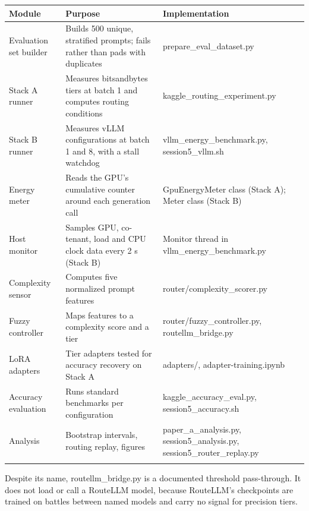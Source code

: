 \begingroup\footnotesize\setlength{\tabcolsep}{4pt}
\begin{longtable}{>{\raggedright\arraybackslash}p{32.6mm}>{\raggedright\arraybackslash}p{53.7mm}>{\raggedright\arraybackslash}p{55.3mm}}
\toprule
\textbf{Module} & \textbf{Purpose} & \textbf{Implementation} \\
\midrule
\endhead
Evaluation set builder & Builds 500 unique, stratified prompts; fails rather than pads with duplicates & prepare\_\allowbreak{}eval\_\allowbreak{}dataset.py \\*
Stack A runner & Measures bitsandbytes tiers at batch 1 and computes routing conditions & kaggle\_\allowbreak{}routing\_\allowbreak{}experiment.py \\
Stack B runner & Measures vLLM configurations at batch 1 and 8, with a stall watchdog & vllm\_\allowbreak{}energy\_\allowbreak{}benchmark.py, session5\_\allowbreak{}vllm.sh \\
Energy meter & Reads the GPU's cumulative counter around each generation call & GpuEnergyMeter class (Stack A); Meter class (Stack B) \\
Host monitor & Samples GPU, co-tenant, load and CPU clock data every 2 s (Stack B) & Monitor thread in vllm\_\allowbreak{}energy\_\allowbreak{}benchmark.py \\
Complexity sensor & Computes five normalized prompt features & router/complexity\_\allowbreak{}scorer.py \\
Fuzzy controller & Maps features to a complexity score and a tier & router/fuzzy\_\allowbreak{}controller.py, routellm\_\allowbreak{}bridge.py \\
LoRA adapters & Tier adapters tested for accuracy recovery on Stack A & adapters/, adapter-training.ipynb \\*
Accuracy evaluation & Runs standard benchmarks per configuration & kaggle\_\allowbreak{}accuracy\_\allowbreak{}eval.py, session5\_\allowbreak{}accuracy.sh \\*
Analysis & Bootstrap intervals, routing replay, figures & paper\_\allowbreak{}a\_\allowbreak{}analysis.py, session5\_\allowbreak{}analysis.py, session5\_\allowbreak{}router\_\allowbreak{}replay.py \\*
\bottomrule\noalign{\nobreak}
\end{longtable}
\addtocounter{table}{-1}
\endgroup

Despite its name, routellm\_\allowbreak{}bridge.py is a documented threshold pass-through. It does not load or call a RouteLLM model, because RouteLLM's checkpoints are trained on battles between named models and carry no signal for precision tiers.

